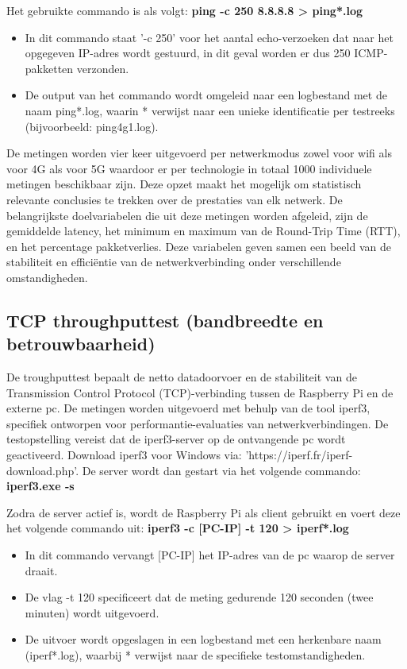 Het gebruikte commando is als volgt: \textbf{ping -c 250 8.8.8.8 > ping*.log}

\begin{itemize}
    \item In dit commando staat ’-c 250’ voor het aantal echo-verzoeken dat naar het opgegeven IP-adres wordt gestuurd, in dit geval worden er dus 250 ICMP-pakketten verzonden. 
    \item De output van het commando wordt omgeleid naar een logbestand met de naam ping*.log, waarin * verwijst naar een unieke identificatie per testreeks (bijvoorbeeld: ping4g1.log).
\end{itemize}


De metingen worden vier keer uitgevoerd per netwerkmodus zowel voor wifi als voor 4G als voor 5G waardoor er per technologie in totaal 1000 individuele metingen beschikbaar zijn. Deze opzet maakt het mogelijk om statistisch relevante conclusies te trekken over de prestaties van elk netwerk.
De belangrijkste doelvariabelen die uit deze metingen worden afgeleid, zijn de gemiddelde latency, het minimum en maximum van de Round-Trip Time (RTT), en het percentage pakketverlies. Deze variabelen geven samen een beeld van de stabiliteit en efficiëntie van de netwerkverbinding onder verschillende omstandigheden.


\subsection{TCP throughputtest (bandbreedte en betrouwbaarheid)}
De troughputtest bepaalt de netto datadoorvoer en de stabiliteit van de Transmission Control Protocol (TCP)-verbinding tussen de Raspberry Pi en de externe pc. De metingen worden uitgevoerd met behulp van de tool iperf3, specifiek ontworpen voor performantie-evaluaties van netwerkverbindingen. 
De testopstelling vereist dat de iperf3-server op de ontvangende pc wordt geactiveerd. Download iperf3 voor Windows via: ’https://iperf.fr/iperf-download.php’.
De server wordt dan gestart via het volgende commando: \textbf{iperf3.exe -s} 

Zodra de server actief is, wordt de Raspberry Pi als client gebruikt en voert deze het volgende commando uit: \textbf{iperf3 -c [PC-IP] -t 120 > iperf*.log}

\begin{itemize}
    \item In dit commando vervangt [PC-IP] het IP-adres van de pc waarop de server draait.
    \item De vlag -t 120 specificeert dat de meting gedurende 120 seconden (twee minuten) wordt uitgevoerd. 
    \item De uitvoer wordt opgeslagen in een logbestand met een herkenbare naam (iperf*.log), waarbij * verwijst naar de specifieke testomstandigheden.
\end{itemize}


